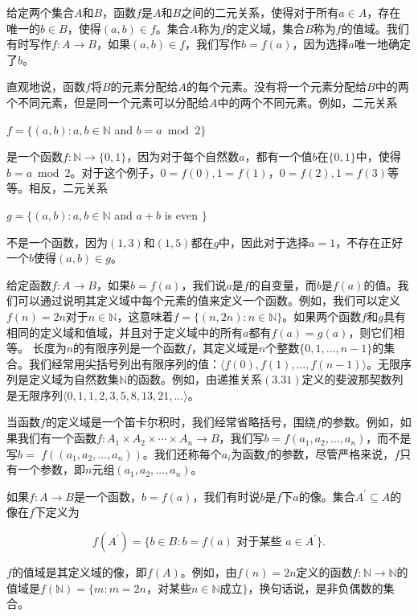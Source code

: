 \documentclass[lang=cn,newtx,10pt,scheme=chinese]{elegantbook}
\begin{document}
给定两个集合$A$和$B$，函数$f$是$A$和$B$之间的二元关系，使得对于所有$a \in A$，存在唯一的$b \in B$，使得$(a, b) \in f$。集合$A$称为$f$的定义域，集合$B$称为$f$的值域。我们有时写作$f: A \rightarrow B$，如果$(a, b) \in f$，我们写作$b=f(a)$，因为选择$a$唯一地确定了$b$。

直观地说，函数$f$将$B$的元素分配给$A$的每个元素。没有将一个元素分配给$B$中的两个不同元素，但是同一个元素可以分配给$A$中的两个不同元素。例如，二元关系

$f=\{(a, b): a, b \in \mathbb{N}$ and $b=a \bmod 2\}$

是一个函数$f: \mathbb{N} \rightarrow\{0,1\}$，因为对于每个自然数$a$，都有一个值$b$在$\{0,1\}$中，使得$b=a \bmod 2$。对于这个例子，$0=f(0), 1=f(1)$，$0=f(2), 1=f(3)$等等。相反，二元关系

$g=\{(a, b): a, b \in \mathbb{N}$ and $a+b$ is even $\}$

不是一个函数，因为$(1,3)$和$(1,5)$都在$g$中，因此对于选择$a=1$，不存在正好一个$b$使得$(a, b) \in g$。

给定函数$f: A \rightarrow B$，如果$b=f(a)$，我们说$a$是$f$的自变量，而$b$是$f(a)$的值。我们可以通过说明其定义域中每个元素的值来定义一个函数。例如，我们可以定义$f(n)=2 n$对于$n \in \mathbb{N}$，这意味着$f=\{(n, 2 n): n \in \mathbb{N}\}$。如果两个函数$f$和$g$具有相同的定义域和值域，并且对于定义域中的所有$a$都有$f(a)=g(a)$，则它们相等。
长度为$n$的有限序列是一个函数$f$，其定义域是$n$个整数$\{0,1, \ldots, n-1\}$的集合。我们经常用尖括号列出有限序列的值：$\langle f(0), f(1), \ldots, f(n-1)\rangle$。无限序列是定义域为自然数集$\mathbb{N}$的函数。例如，由递推关系$(3.31)$定义的斐波那契数列是无限序列$\langle 0,1,1,2,3,5,8,13,21, \ldots\rangle$。

当函数$f$的定义域是一个笛卡尔积时，我们经常省略括号，围绕$f$的参数。例如，如果我们有一个函数$f: A_1 \times A_2 \times \cdots \times A_n \rightarrow B$，我们写$b=f(a_1, a_2, \ldots, a_n)$，而不是写$b=$ $f((a_1, a_2, \ldots, a_n))$。我们还称每个$a_i$为函数$f$的参数，尽管严格来说，$f$只有一个参数，即$n$元组$(a_1, a_2, \ldots, a_n)$。

如果$f: A \rightarrow B$是一个函数，$b=f(a)$，我们有时说$b$是$f$下$a$的像。集合$A^{\prime} \subseteq A$的像在$f$下定义为

$$
f(A^{\prime})=\{b \in B: b=f(a) \text { 对于某些 } a \in A^{\prime}\} .
$$

$f$的值域是其定义域的像，即$f(A)$。例如，由$f(n)=2 n$定义的函数$f: \mathbb{N} \rightarrow \mathbb{N}$的值域是$f(\mathbb{N})=\{m: m=2 n$，对某些$n \in \mathbb{N}$成立$\}$，换句话说，是非负偶数的集合。
\end{document}
